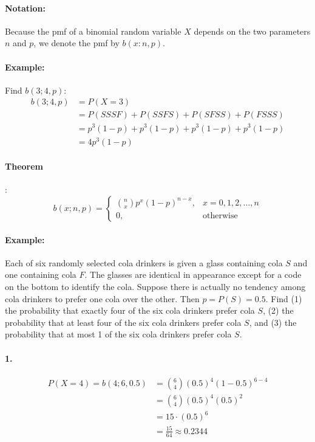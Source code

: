 \paragraph*{Notation:}
Because the pmf of a binomial random variable $X$ depends on the two parameters $n$ and $p$, we denote the pmf by $b(x: n, p)$.

\paragraph*{Example:}
Find $b(3; 4, p)$:
\begin{align*}
    b(3; 4, p) &= P(X=3) \\
    &= P(SSSF) + P(SSFS) + P(SFSS) + P(FSSS) \\
    &= p^3(1-p) + p^3(1-p) + p^3(1-p) + p^3(1-p) \\
    &= 4p^3(1-p)
\end{align*}

\paragraph{Theorem}:
\[
    b(x; n, p) = \begin{cases}
        \binom{n}{x} p^x (1-p)^{n-x}, & x = 0, 1, 2, \ldots, n \\
        0, & \text{otherwise}
    \end{cases}
\]

\paragraph*{Example:}
Each of six randomly selected cola drinkers is given a glass containing cola $S$ and one containing cola $F$. 
The glasses are identical in appearance except for a code on the bottom to identify the cola. 
Suppose there is actually no tendency among cola drinkers to prefer one cola over the other. 
Then $p = P(S) = 0.5$. Find (1) the probability that exactly four of the six cola drinkers prefer cola $S$,
(2) the probability that at least four of the six cola drinkers prefer cola $S$, and (3) the probability that at most
1 of the six cola drinkers prefer cola $S$.

\paragraph*{1.}
\begin{align*}
    P(X=4) = b(4; 6, 0.5) &= \binom{6}{4} (0.5)^4 (1-0.5)^{6-4} \\
    &= \binom{6}{4} (0.5)^4 (0.5)^2 \\
    &= 15 \cdot (0.5)^6 \\
    &= \frac{15}{64} \approx 0.2344
\end{align*}

